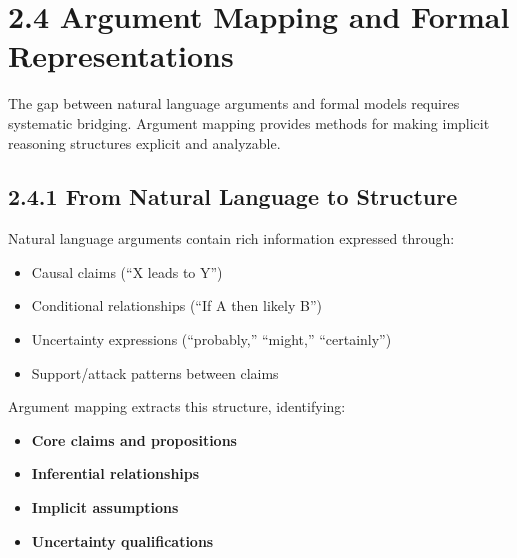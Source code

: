 \documentclass[
  11pt,
  letterpaper,
]{book}
\providecommand{\tightlist}{%
  \setlength{\itemsep}{0pt}\setlength{\parskip}{0pt}}
\begin{document}
\section*{2.4 Argument Mapping and Formal
Representations}\label{sec-argument-mapping}


The gap between natural language arguments and formal models requires
systematic bridging. Argument mapping provides methods for making
implicit reasoning structures explicit and analyzable.

\subsection*{2.4.1 From Natural Language to
Structure}\label{sec-natural-to-structure}

Natural language arguments contain rich information expressed through:

\begin{itemize}
\tightlist
\item
  Causal claims (``X leads to Y'')
\item
  Conditional relationships (``If A then likely B'')
\item
  Uncertainty expressions (``probably,'' ``might,'' ``certainly'')
\item
  Support/attack patterns between claims
\end{itemize}

Argument mapping extracts this structure, identifying:

\begin{itemize}
\tightlist
\item
  \textbf{Core claims and propositions}
\item
  \textbf{Inferential relationships}
\item
  \textbf{Implicit assumptions}
\item
  \textbf{Uncertainty qualifications}
\end{itemize}

\textcite{anderson2007}

\textcite{benn2011}

\textcite{khartabil2021}

\textcite{khartabil2020}

\textcite{ngajie2020}
\end{document}
